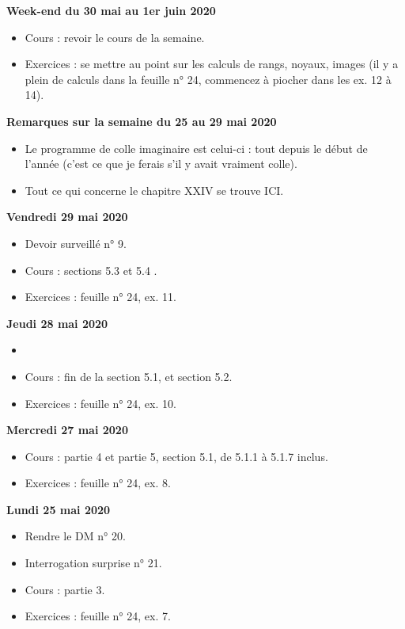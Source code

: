 \documentclass[12pt,a4paper]{article}
\begin{document}
\noindent\textbf{Week-end du 30 mai au 1er juin 2020}
\begin{itemize}
\item Cours : revoir le cours de la semaine.
\item Exercices : se mettre au point sur les calculs de rangs, noyaux, images (il y a plein de calculs dans la feuille n° 24, commencez à piocher dans les ex. 12 à 14).\vspace{.4cm}
\end{itemize}

\noindent\textbf{\bf Remarques sur la semaine du 25 au 29 mai 2020}
\begin{itemize}
\item Le programme de colle imaginaire est celui-ci : tout depuis le début de l'année (c'est ce que je ferais s'il y avait vraiment colle).
\item Tout ce qui concerne le chapitre XXIV se trouve ICI.\vspace{.4cm}
\end{itemize}

\noindent\textbf{Vendredi 29 mai 2020}
\begin{itemize}
\item Devoir surveillé n° 9.
\item Cours : sections 5.3 et 5.4 .
\item Exercices : feuille n° 24, ex. 11.\vspace{.4cm}
\end{itemize}

\noindent\textbf{Jeudi 28 mai 2020}
\begin{itemize}
\item 
\item Cours : fin de la section 5.1, et section 5.2.
\item Exercices : feuille n° 24, ex. 10.\vspace{.4cm}
\end{itemize}
 
\noindent\textbf{Mercredi 27 mai 2020}
\begin{itemize}
\item Cours : partie 4 et partie 5, section 5.1, de 5.1.1 à 5.1.7 inclus.
\item Exercices : feuille n° 24, ex. 8.\vspace{.4cm}
\end{itemize}
 
\noindent\textbf{Lundi 25 mai 2020}
\begin{itemize}
\item Rendre le DM n° 20.
\item Interrogation surprise n° 21.
\item Cours : partie 3.
\item Exercices : feuille n° 24, ex. 7.\vspace{.4cm}
\end{itemize}
\end{document}

